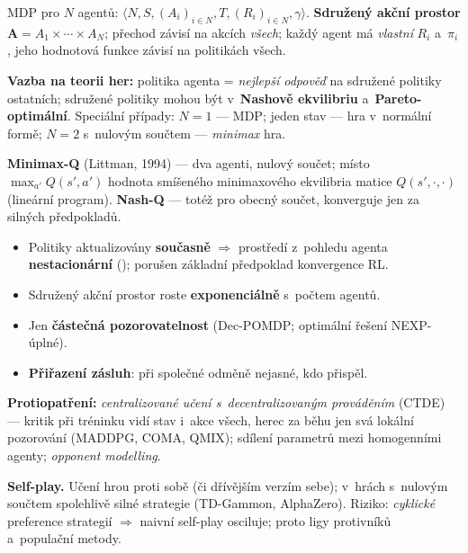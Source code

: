 \documentclass[11pt,a4paper]{article}
\theoremstyle{definition}
\begin{document}
\begin{defbox}
MDP pro $N$ agentů: $\langle N, S, (A_i)_{i\in N}, T, (R_i)_{i \in N}, \gamma\rangle$.
\textbf{Sdružený akční prostor} $\mathbf{A} = A_1 \times \cdots \times A_N$; přechod závisí na
akcích \emph{všech}; každý agent má \emph{vlastní} $R_i$ a~$\pi_i$, jeho hodnotová funkce
závisí na politikách všech.

\textbf{Vazba na teorii her:} politika agenta = \emph{nejlepší odpověď} na sdružené politiky
ostatních; sdružené politiky mohou být v~\textbf{Nashově ekvilibriu} a~\textbf{Pareto-optimální}.
Speciální případy: $N=1$ --- MDP; jeden stav --- hra v~normální formě; $N=2$ s~nulovým součtem
--- \emph{minimax} hra.

\textbf{Minimax-Q} (Littman, 1994) --- dva agenti, nulový součet; místo $\max_{a'} Q(s',a')$
hodnota smíšeného minimaxového ekvilibria matice $Q(s',\cdot,\cdot)$ (lineární program).
\textbf{Nash-Q} --- totéž pro obecný součet, konverguje jen za silných předpokladů.
\end{defbox}

\begin{defbox}
\begin{itemize}
\item Politiky aktualizovány \textbf{současně} $\Rightarrow$ prostředí z~pohledu agenta
  \textbf{nestacionární} (); porušen základní předpoklad konvergence RL.
\item Sdružený akční prostor roste \textbf{exponenciálně} s~počtem agentů.
\item Jen \textbf{částečná pozorovatelnost} (Dec-POMDP; optimální řešení NEXP-úplné).
\item \textbf{Přiřazení zásluh}: při společné odměně nejasné, kdo přispěl.
\end{itemize}
\textbf{Protiopatření:} \emph{centralizované učení s~decentralizovaným prováděním} (CTDE) ---
kritik při tréninku vidí stav i~akce všech, herec za běhu jen svá lokální pozorování (MADDPG,
COMA, QMIX); sdílení parametrů mezi homogenními agenty; \emph{opponent modelling}.
\end{defbox}

\textbf{Self-play.} Učení hrou proti sobě (či dřívějším verzím sebe); v~hrách s~nulovým součtem
spolehlivě silné strategie (TD-Gammon, AlphaZero). Riziko: \emph{cyklické} preference strategií
$\Rightarrow$ naivní self-play osciluje; proto ligy protivníků a~populační metody.
\end{document}
